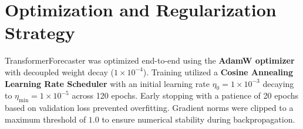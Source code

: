 \section{Optimization and Regularization Strategy}
TransformerForecaster was optimized end-to-end using the \textbf{AdamW optimizer} with decoupled weight decay ($1 \times 10^{-4}$). Training utilized a \textbf{Cosine Annealing Learning Rate Scheduler} with an initial learning rate $\eta_0 = 1 \times 10^{-3}$ decaying to $\eta_{\min} = 1 \times 10^{-5}$ across 120 epochs. Early stopping with a patience of 20 epochs based on validation loss prevented overfitting. Gradient norms were clipped to a maximum threshold of $1.0$ to ensure numerical stability during backpropagation.

